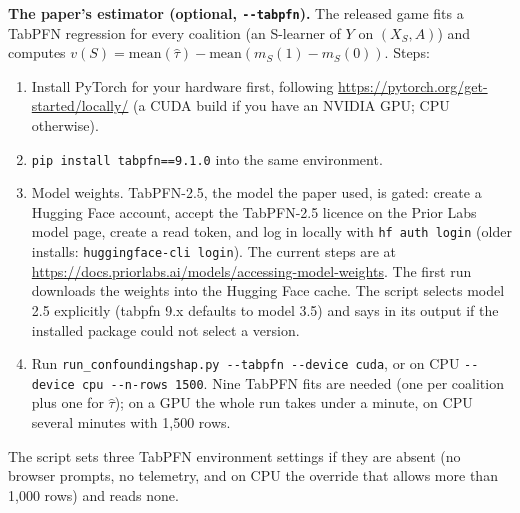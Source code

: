 \documentclass[10pt,letterpaper]{article}
\begin{document}
\textbf{The paper's estimator (optional, \texttt{-{}-tabpfn}).} The released game fits a TabPFN regression for every coalition (an S-learner of $Y$ on $(X_S, A)$) and computes $v(S) = \text{mean}(\hat\tau) - \text{mean}(m_S(1) - m_S(0))$. Steps:
\begin{enumerate}\setlength{\itemsep}{1pt}
\item Install PyTorch for your hardware first, following \url{https://pytorch.org/get-started/locally/} (a CUDA build if you have an NVIDIA GPU; CPU otherwise).
\item \texttt{pip install tabpfn==9.1.0} into the same environment.
\item Model weights. TabPFN-2.5, the model the paper used, is gated: create a Hugging Face account, accept the TabPFN-2.5 licence on the Prior Labs model page, create a read token, and log in locally with \texttt{hf auth login} (older installs: \texttt{huggingface-cli login}). The current steps are at \url{https://docs.priorlabs.ai/models/accessing-model-weights}. The first run downloads the weights into the Hugging Face cache. The script selects model 2.5 explicitly (tabpfn 9.x defaults to model 3.5) and says in its output if the installed package could not select a version.
\item Run \texttt{run\_confoundingshap.py -{}-tabpfn -{}-device cuda}, or on CPU \texttt{-{}-device cpu -{}-n-rows 1500}. Nine TabPFN fits are needed (one per coalition plus one for $\hat\tau$); on a GPU the whole run takes under a minute, on CPU several minutes with 1,500 rows.
\end{enumerate}
The script sets three TabPFN environment settings if they are absent (no browser prompts, no telemetry, and on CPU the override that allows more than 1,000 rows) and reads none.
\end{document}
